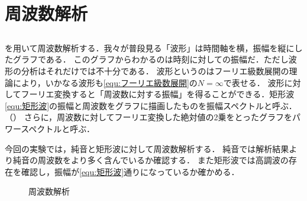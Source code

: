 \chapter{周波数解析}
\section{\kadaiba}\label{sec:\kadaiba}
\purpose
\matlab を用いて周波数解析する．我々が普段見る「波形」は時間軸を横，振幅を縦にしたグラフである．
このグラフからわかるのは時刻に対しての振幅だ．ただし波形の分析はそれだけでは不十分である．
波形というのはフーリエ級数展開の理論により，いかなる波形も\eqref{equ:フーリエ級数展開}の\(N=\infty\)で表せる．
波形に対してフーリエ変換すると「周波数に対する振幅」を得ることができる．矩形波\eqref{equ:矩形波}の振幅と周波数をグラフに描画したものを振幅スペクトルと呼ぶ．（）
さらに，周波数に対してフーリエ変換した絶対値の2乗をとったグラフをパワースペクトルと呼ぶ．\par
今回の実験では，純音と矩形波に対して周波数解析する．
純音では解析結果より純音の周波数をより多く含んでいるか確認する．
また矩形波では高調波の存在を確認し，振幅が\eqref{equ:矩形波}通りになっているか確かめる．
\begin{figure}[H]
    \centering
    \scalebox{0.8}{
        
    }
    \caption{周波数解析}
    \label{fig:周波数解析}
\end{figure}
\method
